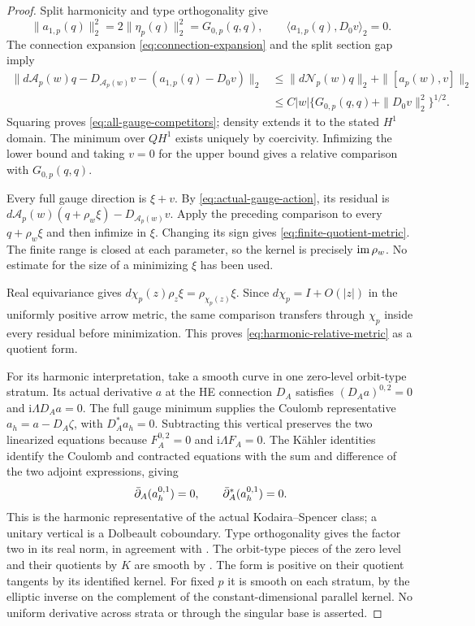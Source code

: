 \begin{proof}
Split harmonicity and type orthogonality give
\[
 \|a_{1,p}(q)\|_2^2=2\|\eta_p(q)\|_2^2=G_{0,p}(q,q),
 \qquad \langle a_{1,p}(q),D_0v\rangle_2=0.
\]
The connection expansion \eqref{eq:connection-expansion}
and the split section gap imply
\[
 \begin{split}
 \|d\mathcal A_p(w)q-D_{\mathcal A_p(w)}v
                           -(a_{1,p}(q)-D_0v)\|_2
 &\le\|d\mathcal N_p(w)q\|_2+\|[a_p(w),v]\|_2\\
 &\le C|w|\{G_{0,p}(q,q)+\|D_0v\|_2^2\}^{1/2}.
 \end{split}
\]
Squaring proves \eqref{eq:all-gauge-competitors}; density
extends it to the stated $H^1$ domain. The minimum over
$QH^1$ exists uniquely by coercivity. Infimizing the lower
bound and taking $v=0$ for the upper bound gives a relative
comparison with $G_{0,p}(q,q)$.

Every full gauge direction is $\xi+v$. By
\eqref{eq:actual-gauge-action}, its residual is
$d\mathcal A_p(w)(q+\rho_w\xi)-D_{\mathcal A_p(w)}v$.
Apply the preceding comparison to every $q+\rho_w\xi$
and then infimize in $\xi$. Changing its sign gives
\eqref{eq:finite-quotient-metric}. The finite range is
closed at each parameter, so the kernel is precisely
$\operatorname{im}\rho_w$. No estimate for the size of a minimizing
$\xi$ has been used.

Real equivariance gives
$d\chi_p(z)\rho_z\xi=\rho_{\chi_p(z)}\xi$.
Since $d\chi_p=I+O(|z|)$ in the uniformly positive arrow
metric, the same comparison transfers through $\chi_p$
inside every residual before minimization. This proves
\eqref{eq:harmonic-relative-metric} as a quotient form.

For its harmonic interpretation, take a smooth curve in
one zero-level orbit-type stratum. Its actual derivative
$a$ at the HE connection $D_A$ satisfies
$(D_Aa)^{0,2}=0$ and $\mathrm i\Lambda D_Aa=0$.
The full gauge minimum supplies the Coulomb representative
$a_h=a-D_A\zeta$, with $D_A^*a_h=0$.
Subtracting this vertical preserves the two linearized
equations because $F_A^{0,2}=0$ and
$\mathrm i\Lambda F_A=0$. The Kähler identities identify
the Coulomb and contracted equations with the sum and
difference of the two adjoint expressions, giving
\[
 \bar\partial_A(a_h^{0,1})=0,\qquad \bar\partial_A^*(a_h^{0,1})=0.
\]
This is the harmonic representative of the actual
Kodaira--Spencer class; a unitary vertical is a Dolbeault
coboundary. Type orthogonality gives the factor two in
its real norm, in agreement with
\cite[Section 7.2 and equations (7.6.5), (7.6.20)--(7.6.21)]{Kobayashi}.
The orbit-type pieces of the zero level and their quotients
by $K$ are smooth by \cite[Theorem 2.1]{SL}.
The form is positive on their quotient tangents by its
identified kernel. For fixed $p$ it is smooth on each
stratum, by the elliptic inverse on the complement of
the constant-dimensional parallel kernel. No uniform
derivative across strata or through the singular base
is asserted.
\end{proof}

